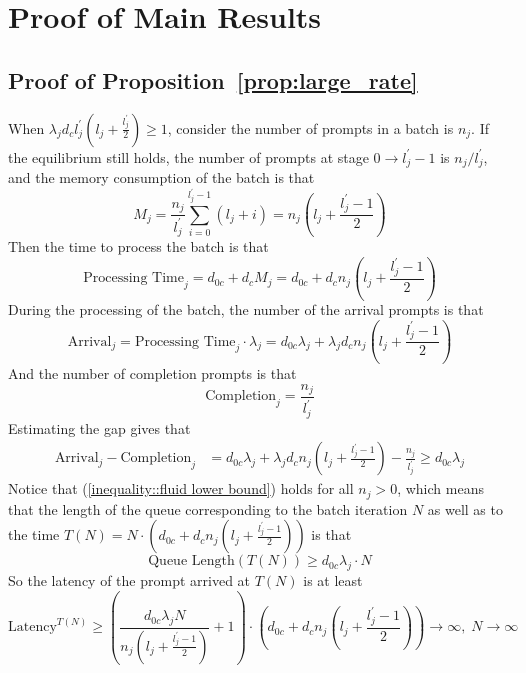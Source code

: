 \section{Proof of Main Results}

\subsection{Proof of Proposition~\ref{prop:large_rate}}\label{appendix::proof of fluid lower bound}
When $\lambda_jd_{c}l_j^{\prime}\left( l_j + \frac{l_j^\prime}{2} \right)\geq 1$, consider the number of prompts in a batch is $n_j$. If the equilibrium still holds, the number of prompts at stage $0 \to l_j^\prime-1$ is $n_j/l_j^\prime$, and the memory consumption of the batch is that
$$M_j = \frac{n_j}{l_j^\prime}\sum_{i=0}^{l_j^\prime-1}\left( l_j +i \right) = n_j \left(l_j + \frac{l_j^\prime-1}{2} \right)$$
Then the time to process the batch is that
$$\text{Processing Time}_j = d_{0c}+d_cM_j=  
 d_{0c}+d_cn_j \left(l_j + \frac{l_j^\prime-1}{2} \right)
$$
During the processing of the batch, the number of the arrival prompts is that
$$\text{Arrival}_j =\text{Processing Time}_j \cdot \lambda_j= 
 d_{0c}\lambda_j+\lambda_jd_cn_j \left(l_j + \frac{l_j^\prime-1}{2} \right)$$
And the number of completion prompts is that
$$\text{Completion}_j = \frac{n_j}{l_j^\prime}$$
Estimating the gap gives that
\begin{align}
    \text{Arrival}_j-\text{Completion}_j  &= d_{0c}\lambda_j+\lambda_jd_cn_j \left(l_j + \frac{l_j^\prime-1}{2} \right) - \frac{n_j}{l_j^\prime}\geq d_{0c}\lambda_j\label{inequality::fluid lower bound}
\end{align}
Notice that (\ref{inequality::fluid lower bound}) holds for all $n_j>0$, which means that the length of the queue corresponding to the batch iteration $N$ as well as to the time $T(N) = N \cdot \left(d_{0c}+d_cn_j\left(l_j + \frac{l_j^\prime-1}{2}\right)\right)$ is that
$$\text{Queue Length}\left(T(N)\right) \geq d_{0c}\lambda_j\cdot N$$
So the latency of the prompt arrived at $T(N)$ is at least 
$$\text{Latency}^{T(N)} \geq  \left(\frac{d_{0c}\lambda_jN}{n_j\left(l_j + \frac{l_j^\prime-1}{2} \right)}+1\right)\cdot \left( 
 d_{0c}+d_cn_j \left(l_j + \frac{l_j^\prime-1}{2} \right) \right)\to \infty,\;N\to \infty$$


